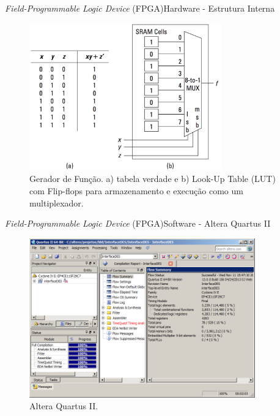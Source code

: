     
    \begin{frame}{\textit{Field-Programmable Logic Device} (FPGA)}{Hardware - Estrutura Interna}
    \vspace{-1em}
    \begin{figure}[p]
        \centering
        \includegraphics[width=0.74\textwidth]{img/fpga/funcao-geradora.png}
        \vspace{-0.7em}
        \caption{Gerador de Função. a) tabela verdade e b) Look-Up Table (LUT) com Flip-flops para armazenamento e execução como um multiplexador.}
        \label{fig:funcao-geradora}
    \end{figure}
    \end{frame}
    
    
    	\begin{frame}{\textit{Field-Programmable Logic Device} (FPGA)}{Software - Altera Quartus II}
            \vspace{-1em}
    		\begin{figure}[p]
    			\centering
    			\includegraphics[width=0.87\textwidth]{img/fpga/altera.png}
                \vspace{-0.8em}
    			\caption{Altera Quartus II.}
    			\label{fig:alteraquartus}
    		\end{figure}
    	\end{frame}
    
